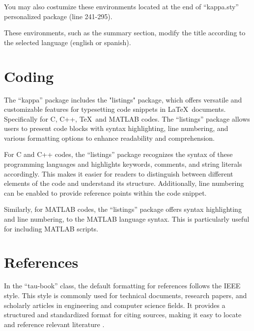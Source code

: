 \documentclass[10pt,a4paper,twoside]{main}
\begin{document}
        You may also costumize these environments located at the end of ``kappa.sty'' personalized package (line 241-295).

        \begin{note}
            These environments, such as the summary section, modify the title according to the selected language (english or spanish).
        \end{note}

\section{Coding}

    The ``kappa'' package includes the "listings" package, which offers versatile and customizable features for typesetting code snippets in \LaTeX\ documents. Specifically for C, C++, \TeX\ and MATLAB codes. The ``listings'' package allows users to present code blocks with syntax highlighting, line numbering, and various formatting options to enhance readability and comprehension.

    For C and C++ codes, the ``listings'' package recognizes the syntax of these programming languages and highlights keywords, comments, and string literals accordingly. This makes it easier for readers to distinguish between different elements of the code and understand its structure. Additionally, line numbering can be enabled to provide reference points within the code snippet.

    

    Similarly, for MATLAB codes, the ``listings'' package offers syntax highlighting and line numbering, to the MATLAB language syntax. This is particularly useful for including MATLAB scripts.

    

\section{References}

    In the ``tau-book'' class, the default formatting for references follows the IEEE style. This style is commonly used for technical documents, research papers, and scholarly articles in engineering and computer science fields. It provides a structured and standardized format for citing sources, making it easy to locate and reference relevant literature \cite{einstein}.
\end{document}
